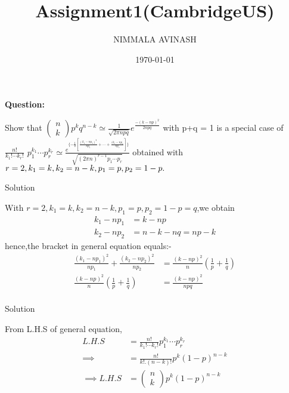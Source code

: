 \documentclass{beamer}
\title{Assignment1(CambridgeUS)}
\author{NIMMALA AVINASH}
\institute{IITH}
\date{\today}
\newcommand{\myvec}[1]{\ensuremath{\begin{pmatrix}#1\end{pmatrix}}}
\begin{document}
\frame{\titlepage}
\begin{frame}
{\LARGE \textbf{Question:\\}}
\begin{Large}
Show that $\myvec{n \\ k}p^{k}q^{n-k}  \simeq \frac{1}{\sqrt{2\pi npq}}e^{\frac{-(k-np)^{2}}{2npq}}$ with p+q = 1 is a special case of $ \frac{n!}{k_{1}! \cdots k_{r}!}$ $p_{1}^{k_{1}} \cdots  p_{r}^{k_{r}}  \simeq \frac{e^{\{ -\frac{1}{2}[\frac{(k_{1}-np_{1})^{2}}{np_{1}}+ \cdots + \frac{(k_{r}-np_{r}}{np_{r}}]\}}}{\sqrt{(2\pi n)^{r-1} p_{1} \cdots p_{r}}}$ obtained with $ r=2,k_{1}=k,k_{2}=n-k,p_{1}=p,p_{2}=1-p.\\ $
\end{Large}
\end{frame}
\begin{frame}{Solution}
\begin{Large}
With $r = 2,k_{1} = k,k_{2} = n-k,p_{1} = p,p_{2} = 1-p = q$,we obtain  \\
\begin{align}
k_{1} - np_{1} &= k-np  \\
k_{2} -np_{2} &= n-k-nq = np-k 
\end{align}
hence,the bracket in general equation equals:-\\
\begin{align}\frac{(k_{1}-np_{1})^{2}}{np_{1}}+\frac{(k_{2}-np_{2})^{2}}{np_{2}} &= \frac{(k-np)^{2}}{n}(\frac{1}{p}+\frac{1}{q})\\
\frac{(k-np)^{2}}{n}(\frac{1}{p}+\frac{1}{q}) &= \frac{(k-np)^{2}}{npq}\\
\end{align}
\end{Large}
\end{frame}
\begin{frame}{Solution}
\begin{Large}
From L.H.S of general equation,\\
\begin{align}
L.H.S &=\frac{n!}{k_{1}! \cdots k_{r}!}p_{1}^{k_{1}} \cdots p_{r}^{k_{r}}\\
\implies &= \frac{n!}{k!.(n-k)!}p^{k}(1-p)^{n-k}\\
\implies L.H.S&=\myvec{n \\ k}p^{k}(1-p)^{n-k}
\end{align}
\end{Large}
\end{frame}
\end{document}
